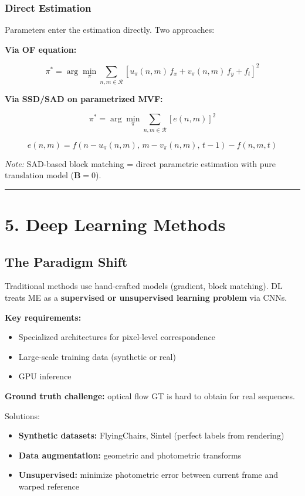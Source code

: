 \subsubsection{Direct Estimation}

Parameters enter the estimation directly. Two approaches:

\textbf{Via OF equation:}

\[
\pi^* = \arg\min_\pi \sum_{n,m \in \mathcal{R}} \left[u_\pi(n,m)\, f_x + v_\pi(n,m)\, f_y + f_t\right]^2
\]

\textbf{Via SSD/SAD on parametrized MVF:}

\[
\pi^* = \arg\min_\pi \sum_{n,m \in \mathcal{R}} \left[e(n,m)\right]^2
\]

\[
e(n,m) = f\!\left(n - u_\pi(n,m),\, m - v_\pi(n,m),\, t-1\right) - f(n,m,t)
\]

\textit{Note:} SAD-based block matching = direct parametric estimation with pure translation model ($\mathbf{B} = 0$).

\bigskip\hrule\bigskip

\section{5. Deep Learning Methods}

\subsection{The Paradigm Shift}

Traditional methods use hand-crafted models (gradient, block matching). DL treats ME as a \textbf{supervised or unsupervised learning problem} via CNNs.

\textbf{Key requirements:}
\begin{itemize}
\item Specialized architectures for pixel-level correspondence
\item Large-scale training data (synthetic or real)
\item GPU inference
\end{itemize}

\textbf{Ground truth challenge:} optical flow GT is hard to obtain for real sequences.

Solutions:
\begin{itemize}
\item \textbf{Synthetic datasets:} FlyingChairs, Sintel (perfect labels from rendering)
\item \textbf{Data augmentation:} geometric and photometric transforms
\item \textbf{Unsupervised:} minimize photometric error between current frame and warped reference
\end{itemize}

